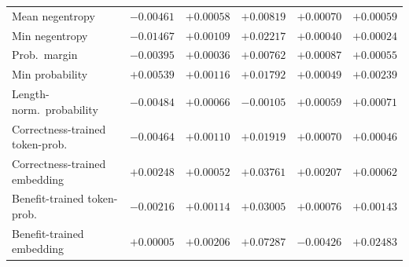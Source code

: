 \begin{table}[htbp]
{\begin{tabular}{lccccc}
\midrule
Mean negentropy & $-0.00461$ & $+0.00058$ & $+0.00819$ & $+0.00070$ & $+0.00059$ \\
Min negentropy & $-0.01467$ & $+0.00109$ & $+0.02217$ & $+0.00040$ & $+0.00024$ \\
Prob.\ margin & $-0.00395$ & $+0.00036$ & $+0.00762$ & $+0.00087$ & $+0.00055$ \\
Min probability & $+0.00539$ & $+0.00116$ & $+0.01792$ & $+0.00049$ & $+0.00239$ \\
Length-norm.\ probability & $-0.00484$ & $+0.00066$ & $-0.00105$ & $+0.00059$ & $+0.00071$ \\
Correctness-trained token-prob. &$-0.00464$ & $+0.00110$ & $+0.01919$ & $+0.00070$ & $+0.00046$ \\
Correctness-trained embedding &$+0.00248$ & $+0.00052$ & $+0.03761$ & $+0.00207$ & $+0.00062$ \\
Benefit-trained token-prob. &$-0.00216$ & $+0.00114$ & $+0.03005$ & $+0.00076$ & $+0.00143$ \\
Benefit-trained embedding &$+0.00005$ & $+0.00206$ & $+0.07287$ & $-0.00426$ & $+0.02483$ \\
\bottomrule
\end{tabular}}
\end{table}
